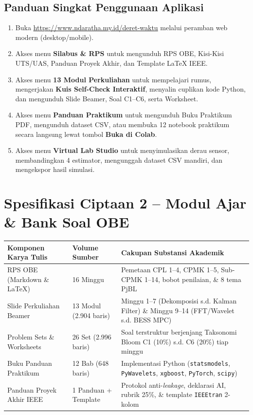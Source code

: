 \documentclass[11pt,a4paper]{article}
\newcommand{\hdr}[1]{\cellcolor{headerrow}\color{white}\textbf{#1}}
\begin{document}
\subsection{Panduan Singkat Penggunaan Aplikasi}
\begin{enumerate}[label=\textbf{\arabic*.}, leftmargin=1.5em, itemsep=2pt]
    \item Buka \url{https://www.ndaratha.my.id/deret-waktu} melalui peramban web modern (desktop/mobile).
    \item Akses menu \textbf{Silabus \& RPS} untuk mengunduh RPS OBE, Kisi-Kisi UTS/UAS, Panduan Proyek Akhir, dan Template LaTeX IEEE.
    \item Akses menu \textbf{13 Modul Perkuliahan} untuk mempelajari rumus, mengerjakan \textbf{Kuis Self-Check Interaktif}, menyalin cuplikan kode Python, dan mengunduh Slide Beamer, Soal C1--C6, serta Worksheet.
    \item Akses menu \textbf{Panduan Praktikum} untuk mengunduh Buku Praktikum PDF, mengunduh dataset CSV, atau membuka 12 notebook praktikum secara langsung lewat tombol \textbf{Buka di Colab}.
    \item Akses menu \textbf{Virtual Lab Studio} untuk menyimulasikan derau sensor, membandingkan 4 estimator, mengunggah dataset CSV mandiri, dan mengekspor hasil simulasi.
\end{enumerate}

\section{Spesifikasi Ciptaan 2 -- Modul Ajar \& Bank Soal OBE}

{\footnotesize
\setlength{\tabcolsep}{4pt}
\begin{tabular}{|p{3.8cm}|p{2.3cm}|p{9.2cm}|}
\hline
\hdr{Komponen Karya Tulis} & \hdr{Volume Sumber} & \hdr{Cakupan Substansi Akademik} \\ \hline
RPS OBE (Markdown \& LaTeX) & 16 Minggu & Pemetaan CPL 1--4, CPMK 1--5, Sub-CPMK 1--14, bobot penilaian, \& 8 tema PjBL \\ \hline
Slide Perkuliahan Beamer & 13 Modul (2.904 baris) & Minggu 1--7 (Dekomposisi s.d. Kalman Filter) \& Minggu 9--14 (FFT/Wavelet s.d. BESS MPC) \\ \hline
Problem Sets \& Worksheets & 26 Set (2.996 baris) & Soal terstruktur berjenjang Taksonomi Bloom C1 (10\%) s.d. C6 (20\%) tiap minggu \\ \hline
Buku Panduan Praktikum & 12 Bab (648 baris) & Implementasi Python (\texttt{statsmodels}, \texttt{PyWavelets}, \texttt{xgboost}, \texttt{PyTorch}, \texttt{scipy}) \\ \hline
Panduan Proyek Akhir IEEE & 1 Panduan + Template & Protokol anti-\textit{leakage}, deklarasi AI, rubrik 25\%, \& template \texttt{IEEEtran} 2-kolom \\ \hline
\end{tabular}
}
\end{document}

